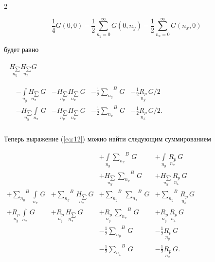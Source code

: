 \documentclass[twoside, 10pt]{article}
\begin{document}
\begin{multicols}{2}
    

    \[
\frac{1}{4}G\left(0, 0\right)
- \frac{1}{2}\sum\limits_{n_y=0}^{\infty}{G\left(0, n_y\right)}
- \frac{1}{2}\sum\limits_{n_x=0}^{\infty}{G\left(n_x, 0\right)}
\]

    будет равно

\noindent
\(\begin{array}{l}
    \begin{array}{l}
  \underset{n_y}{H_{\sum}} \underset{n_x}{H_{\sum}} G \\
\end{array} \\
\begin{array}{rrrrr}
  \, &  - \int\limits_{n_y}^{} \underset{n_x}{H_{\sum}}\,G &  - \underset{n_y}{H_{\sum}} \underset{n_x}{H_{\sum}}\,G &  - \frac{1}{2}{\sum\limits_{n_y}^{}}^{B}\,G &  - \frac{1}{2}\underset{n_y}{R_{p}}\,G/2 \\
  \,&  - \underset{n_y}{H_{\sum}}\int\limits_{n_x}^{} \,G &  - \underset{n_y}{H_{\sum}} \underset{n_x}{H_{\sum}}\,G &  - \frac{1}{2}{\sum\limits_{n_x}^{}}^{B}\,G &  - \frac{1}{2}\underset{n_x}{R_{p}}\,G/2. \\
\end{array}
\end{array}\)

    Теперь выражение (\ref{eq:12}) можно найти следующим суммированием




\noindent
    \(\begin{array}{llll}  \,&  \,&  + \int\limits_{n_y}^{}{\sum\limits_{n_x}^{}}^{B}\,G &  + \int\limits_{n_y}^{}\,\underset{n_x}{R_{p}}\,G \\  \,&  \,&  + \underset{n_y}{H_{\sum}}\,{\sum\limits_{n_x}^{}}^{B}\,G &  + \underset{n_y}{H_{\sum}}\,\underset{n_x}{R_{p}}\,G \\  + {\sum\limits_{n_y}^{}}^{B}\,\int\limits_{n_x}^{}\,G &  + {\sum\limits_{n_y}^{}}^{B}\,\underset{n_x}{H_{\sum}}\,G &  + {\sum\limits_{n_y}^{}}^{B}\,{\sum\limits_{n_x}^{}}^{B}\,G &  + {\sum\limits_{n_y}^{}}^{B}\,\underset{n_x}{R_{p}}\,G \\  + \underset{n_y}{R_{p}}\,\int\limits_{n_x}^{}\,G &  + \underset{n_y}{R_{p}}\,\underset{n_x}{H_{\sum}}\,G &  + \underset{n_y}{R_{p}}\,{\sum\limits_{n_x}^{}}^{B}\,G &  + \underset{n_y}{R_{p}}\,\underset{n_x}{R_{p}}\,G \\  \,&  \,&  - \frac{1}{2}{\sum\limits_{n_y}^{}}^{B}\,G &  - \frac{1}{2}\underset{n_y}{R_{p}}\,G \\  \,&  \,&  - \frac{1}{2}{\sum\limits_{n_x}^{}}^{B}\,G &  - \frac{1}{2}\underset{n_x}{R_{p}}\,G. \\ \end{array}\)


\end{multicols}
\end{document}
